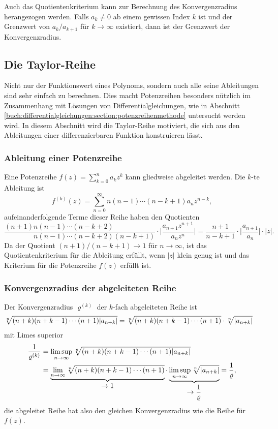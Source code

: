 Auch das Quotientenkriterium kann zur Berechnung des Konvergenzradius
herangezogen werden.
Falls $a_k\ne 0$ ab einem gewissen Index $k$ ist und der Grenzwert
von $a_{k}/a_{k+1}$ für $k\to\infty$ existiert, dann ist der
Grenzwert der Konvergenzradius.

%
%
\subsection{Die Taylor-Reihe
\label{buch:polynome:subsection:taylor-reihe}}
Nicht nur der Funktionswert eines Polynoms, sondern auch alle
seine Ableitungen sind sehr einfach zu berechnen.
Dies macht Potenzreihen besonders nützlich im Zusammenhang
mit Lösungen von Differentialgleichungen, wie in Abschnitt
\ref{buch:differentialgleichungen:section:potenzreihenmethode}
untersucht werden wird.
In diesem Abschnitt wird die Taylor-Reihe motiviert, die sich
aus den Ableitungen einer differenzierbaren Funktion konstruieren
lässt.

\subsubsection{Ableitung einer Potenzreihe}
Eine Potenzreihe
$f(z)=\sum_{k=0}^n a_kz^k$
kann gliedweise abgeleitet werden.
Die $k$-te Ableitung ist
\[
f^{(k)}(z)
=
\sum_{n=0}^\infty n(n-1)\cdots(n-k+1) a_nz^{n-k},
\]
aufeinanderfolgende Terme dieser Reihe haben den Quotienten
\[
\frac{
(n+1)n(n-1)\cdots(n-k+2)\phantom{(n-k+1)}
}{
\phantom{(n+1)}n(n-1)\cdots(n-k+2)(n-k+1)
}
\cdot
\biggl|
\frac{a_{n+1}z^{n+1}}{a_nz^n}
\biggr|
=
\frac{n+1}{n-k+1}
\cdot
\biggl|
\frac{a_{n+1}}{a_n}
\biggr|
\cdot|z|.
\]
Da der Quotient $(n+1)/(n-k+1)\to 1$ für $n\to\infty$, ist das
Quotientenkriterium für die Ableitung erfüllt, wenn $|z|$ klein genug ist
und das Kriterium für die Potenzreihe $f(z)$ erfüllt ist.

\subsubsection{Konvergenzradius der abgeleiteten Reihe}
Der Konvergenzradius $\varrho^{(k)}$ der $k$-fach abgeleiteten Reihe ist
\begin{align*}
\root{n}\of{\mathstrut(n+k)(n+k-1)\cdots(n+1) |a_{n+k}|}
&=
\root{n}\of{\mathstrut(n+k)(n+k-1)\cdots(n+1)}
\cdot
\root{n}\of{|a_{n+k}|}
\end{align*}
mit Limes superior
\begin{align*}
\frac{1}{\varrho^{(k)}}
&=
\limsup_{n\to\infty}
\root{n}\of{\mathstrut(n+k)(n+k-1)\cdots(n+1) |a_{n+k}|}
\\
&=
\underbrace{
\lim_{n\to\infty}
\root{n}\of{\mathstrut(n+k)(n+k-1)\cdots(n+1)}
}_{\displaystyle\to 1}
\cdot
\underbrace{
\limsup_{n\to\infty}
\root{n}\of{\mathstrut|a_{n+k}|}
}_{\displaystyle\to\frac{1}{\varrho}}
=
\frac{1}{\varrho},
\end{align*}
die abgeleitet Reihe hat also den gleichen Konvergenzradius wie die
Reihe für $f(z)$.

